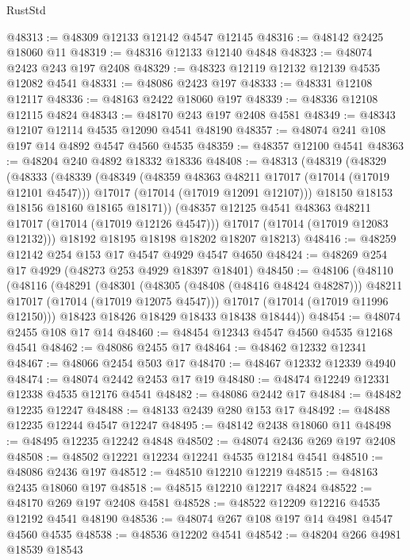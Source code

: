 \begin{lexlean}{RustStd}
\begin{coremodule}
{\begin{coremodule}
{{{{{{{{{{{{{{{{{{{{{{{{{{{{{{{{{{{{{{{{{{{{{{{{{{{{{{{@48313 := @48309 @12133 @12142 @4547 @12145
@48316 := @48142 @2425 @18060 @11
@48319 := @48316 @12133 @12140 @4848
@48323 := @48074 @2423 @243 @197 @2408
@48329 := @48323 @12119 @12132 @12139 @4535 @12082 @4541
@48331 := @48086 @2423 @197
@48333 := @48331 @12108 @12117
@48336 := @48163 @2422 @18060 @197
@48339 := @48336 @12108 @12115 @4824
@48343 := @48170 @243 @197 @2408 @4581
@48349 := @48343 @12107 @12114 @4535 @12090 @4541 @48190
@48357 := @48074 @241 @108 @197 @14 @4892 @4547 @4560 @4535
@48359 := @48357 @12100 @4541
@48363 := @48204 @240 @4892 @18332 @18336
@48408 := @48313
    (@48319
      (@48329
        (@48333
          (@48339
            (@48349
              (@48359 @48363 @48211 @17017 (@17014 (@17019 @12101 @4547)))
              @17017
              (@17014 (@17019 @12091 @12107)))
            @18150
            @18153
            @18156
            @18160
            @18165
            @18171))
        (@48357 @12125 @4541 @48363 @48211 @17017 (@17014 (@17019 @12126 @4547)))
        @17017
        (@17014 (@17019 @12083 @12132)))
      @18192
      @18195
      @18198
      @18202
      @18207
      @18213)
@48416 := @48259 @12142 @254 @153 @17 @4547 @4929 @4547 @4650
@48424 := @48269 @254 @17 @4929 (@48273 @253 @4929 @18397 @18401)
@48450 := @48106
    (@48110
      (@48116
        (@48291
          (@48301
            (@48305 (@48408 (@48416 @48424 @48287)))
            @48211
            @17017
            (@17014 (@17019 @12075 @4547)))
          @17017
          (@17014 (@17019 @11996 @12150)))
        @18423
        @18426
        @18429
        @18433
        @18438
        @18444))
@48454 := @48074 @2455 @108 @17 @14
@48460 := @48454 @12343 @4547 @4560 @4535 @12168 @4541
@48462 := @48086 @2455 @17
@48464 := @48462 @12332 @12341
@48467 := @48066 @2454 @503 @17
@48470 := @48467 @12332 @12339 @4940
@48474 := @48074 @2442 @2453 @17 @19
@48480 := @48474 @12249 @12331 @12338 @4535 @12176 @4541
@48482 := @48086 @2442 @17
@48484 := @48482 @12235 @12247
@48488 := @48133 @2439 @280 @153 @17
@48492 := @48488 @12235 @12244 @4547 @12247
@48495 := @48142 @2438 @18060 @11
@48498 := @48495 @12235 @12242 @4848
@48502 := @48074 @2436 @269 @197 @2408
@48508 := @48502 @12221 @12234 @12241 @4535 @12184 @4541
@48510 := @48086 @2436 @197
@48512 := @48510 @12210 @12219
@48515 := @48163 @2435 @18060 @197
@48518 := @48515 @12210 @12217 @4824
@48522 := @48170 @269 @197 @2408 @4581
@48528 := @48522 @12209 @12216 @4535 @12192 @4541 @48190
@48536 := @48074 @267 @108 @197 @14 @4981 @4547 @4560 @4535
@48538 := @48536 @12202 @4541
@48542 := @48204 @266 @4981 @18539 @18543
}}}}}}}}}}}}}}}}}}}}}}}}}}}}}}}}}}}}}}}}}}}}}}}}}}}}}}}
\end{coremodule}}
\end{coremodule}
\end{lexlean}
